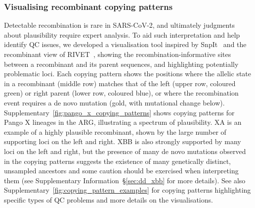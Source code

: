 \documentclass[12pt]{article}
\newcommand{\supref}[1]{Supplementary Information~\S\ref{#1}}
\newcommand{\siref}[1]{Supplementary~\ref{#1}}
\begin{document}

\subsubsection*{Visualising recombinant copying patterns}

Detectable recombination is rare in SARS-CoV-2, and
ultimately judgments about plausibility require expert analysis.
To aid such interpretation and help identify QC issues,
we developed a visualisation tool
inspired by SnpIt~\cite{OToole2024} and
the recombinant view of RIVET~\cite{Smith2023tracking},
showing the recombination-informative sites
between a recombinant and its parent sequences, and
highlighting potentially problematic loci.
Each copying pattern shows the positions
where the allelic state
in a recombinant (middle row) matches that of
the left (upper row, coloured green)
or right parent (lower row, coloured blue),
or where the recombination event requires
a de novo mutation (gold, with mutational change below).
\siref{fig:pango_x_copying_patterns}
shows copying patterns for Pango X lineages in the ARG,
illustrating a spectrum of plausibility.
XA is an example of a highly plausible recombinant,
shown by the large number of supporting loci on the left and right.
XBB is also strongly supported by many loci on the left and right,
but the presence of many de novo mutations
observed in the copying patterns suggests the existence of
many genetically distinct, unsampled ancestors
and some caution should be exercised when interpreting them
(see \supref{sec:dd_xbb} for more details).
See also \siref{fig:copying_pattern_examples} for copying patterns
highlighting specific types of QC problems
and more details on the visualisations.
\end{document}
